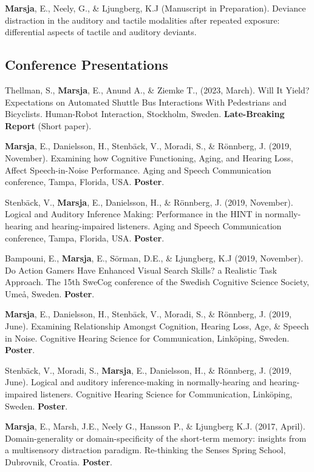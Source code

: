 \documentclass[]{article}
\begin{document}
\textbf{Marsja}, E., Neely, G., \& Ljungberg, K.J (Manuscript in
Preparation). Deviance distraction in the auditory and tactile
modalities after repeated exposure: differential aspects of tactile and
auditory deviants.

\hypertarget{conference-presentations}{%
\subsection{Conference Presentations}\label{conference-presentations}}

Thellman, S., \textbf{Marsja}, E., Anund A., \& Ziemke T., (2023,
March). Will It Yield? Expectations on Automated Shuttle Bus
Interactions With Pedestrians and Bicyclists. Human-Robot Interaction,
Stockholm, Sweden. \textbf{Late-Breaking Report} (Short paper).

\textbf{Marsja}, E., Danielsson, H., Stenbäck, V., Moradi, S., \&
Rönnberg, J. (2019, November). Examining how Cognitive Functioning,
Aging, and Hearing Loss, Affect Speech-in-Noise Performance. Aging and
Speech Communication conference, Tampa, Florida, USA. \textbf{Poster}.

Stenbäck, V., \textbf{Marsja}, E., Danielsson, H., \& Rönnberg, J.
(2019, November). Logical and Auditory Inference Making: Performance in
the HINT in normally-hearing and hearing-impaired listeners. Aging and
Speech Communication conference, Tampa, Florida, USA. \textbf{Poster}.

Bampouni, E., \textbf{Marsja}, E., Sörman, D.E., \& Ljungberg, K.J
(2019, November). Do Action Gamers Have Enhanced Visual Search Skills? a
Realistic Task Approach. The 15th SweCog conference of the Swedish
Cognitive Science Society, Umeå, Sweden. \textbf{Poster}.

\textbf{Marsja}, E., Danielsson, H., Stenbäck, V., Moradi, S., \&
Rönnberg, J. (2019, June). Examining Relationship Amongst Cognition,
Hearing Loss, Age, \& Speech in Noise. Cognitive Hearing Science for
Communication, Linköping, Sweden. \textbf{Poster}.

Stenbäck, V., Moradi, S., \textbf{Marsja}, E., Danielsson, H., \&
Rönnberg, J. (2019, June). Logical and auditory inference-making in
normally-hearing and hearing-impaired listeners. Cognitive Hearing
Science for Communication, Linköping, Sweden. \textbf{Poster}.

\textbf{Marsja}, E., Marsh, J.E., Neely G., Hansson P., \& Ljungberg
K.J. (2017, April). Domain-generality or domain-specificity of the
short-term memory: insights from a multisensory distraction paradigm.
Re-thinking the Senses Spring School, Dubrovnik, Croatia.
\textbf{Poster}.
\end{document}
